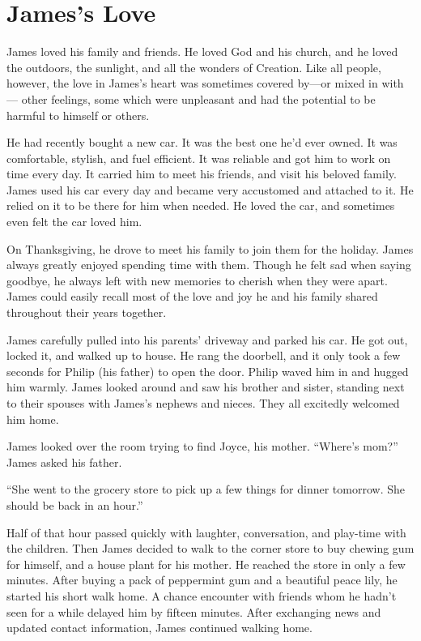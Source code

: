 \chapter{James's Love}

James loved his family and friends. He loved God and his church, and he loved the outdoors, the sunlight, and all the wonders of Creation. Like all people, however, the love in James's heart was sometimes covered by—or mixed in with— other feelings, some which were unpleasant and had the potential to be harmful to himself or others.

He had recently bought a new car. It was the best one he'd ever owned. It was comfortable, stylish, and fuel efficient. It was reliable and got him to work on time every day. It carried him to meet his friends, and visit his beloved family. James used his car every day and became very accustomed and attached to it. He relied on it to be there for him when needed. He loved the car, and sometimes even felt the car loved him.

On Thanksgiving, he drove to meet his family to join them for the holiday. James always greatly enjoyed spending time with them. Though he felt sad when saying goodbye, he always left with new memories to cherish when they were apart. James could easily recall most of the love and joy he and his family shared throughout their years together.

James carefully pulled into his parents' driveway and parked his car. He got out, locked it, and walked up to house. He rang the doorbell, and it only took a few seconds for Philip (his father) to open the door. Philip waved him in and hugged him warmly. James looked around and saw his brother and sister, standing next to their spouses with James's nephews and nieces. They all excitedly welcomed him home.

James looked over the room trying to find Joyce, his mother. “Where's mom?” James asked his father.

“She went to the grocery store to pick up a few things for dinner tomorrow. She should be back in an hour.”

Half of that hour passed quickly with laughter, conversation, and play-time with the children. Then James decided to walk to the corner store to buy chewing gum for himself, and a house plant for his mother. He reached the store in only a few minutes. After buying a pack of peppermint gum and a beautiful peace lily, he started his short walk home. A chance encounter with friends whom he hadn't seen for a while delayed him by fifteen minutes. After exchanging news and updated contact information, James continued walking home.

